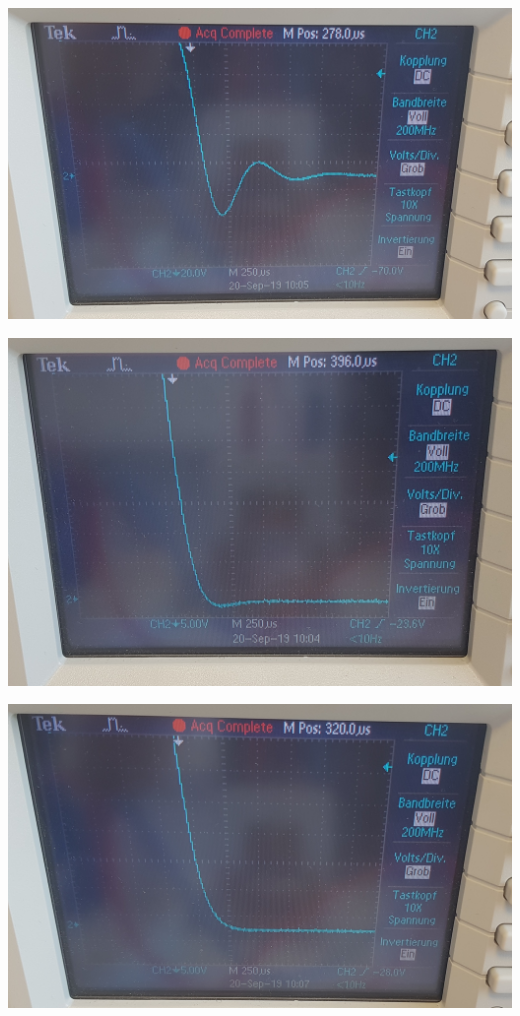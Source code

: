 \documentclass[a4paper, 12pt]{scrartcl}
\begin{document}
\begin{minipage}[t]{0.3\textwidth}
\includegraphics[width=\textwidth]{bilder/oszi1.jpg}
\end{minipage}
\begin{minipage}[t]{0.3\textwidth}
\includegraphics[width=\textwidth]{bilder/oszi2.jpg}
\end{minipage}
\begin{minipage}[t]{0.3\textwidth}
\includegraphics[width=\textwidth]{bilder/oszi3.jpg}
\end{minipage}
\end{document}
